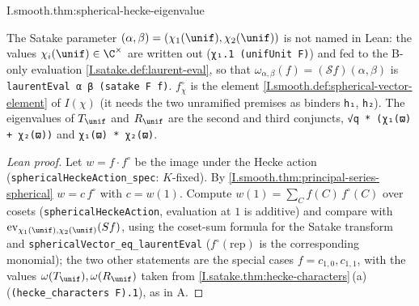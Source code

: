 \begin{tfformal}{I.smooth.thm:spherical-hecke-eigenvalue}
\begin{tffidelity}
The Satake parameter $(\alpha,\beta)=(\chi_1(\unif),\chi_2(\unif))$ is not named in Lean: the values $\chi_i(\unif)\in\C^\times$ are written out (\texttt{χ₁.1 (unifUnit F)}) and fed to the B-only evaluation \cref{I.satake.def:laurent-eval}, so that $\omega_{\alpha,\beta}(f)=(\mathcal Sf)(\alpha,\beta)$ is \texttt{laurentEval α β (satake F f)}. $f^\circ_\chi$ is the element \cref{I.smooth.def:spherical-vector-element} of $I(\chi)$ (it needs the two unramified premises as binders \texttt{h₁}, \texttt{h₂}). The eigenvalues of $T_\unif$ and $R_\unif$ are the second and third conjuncts, \texttt{√q * (χ₁(ϖ) + χ₂(ϖ))} and \texttt{χ₁(ϖ) * χ₂(ϖ)}.
\end{tffidelity}
\end{tfformal}
\begin{proof}[Lean proof]
Let $w=f\cdot f^\circ$ be the image under the Hecke action (\texttt{sphericalHeckeAction\_spec}: $K$-fixed). By \cref{I.smooth.thm:principal-series-spherical} $w=c\,f^\circ$ with $c=w(1)$. Compute $w(1)=\sum_C f(C)\,f^\circ(C)$ over cosets (\texttt{sphericalHeckeAction}, evaluation at $1$ is additive) and compare with $\mathrm{ev}_{\chi_1(\unif),\chi_2(\unif)}(S f)$, using the coset-sum formula for the Satake transform and \texttt{sphericalVector\_eq\_laurentEval} ($f^\circ(\mathrm{rep})$ is the corresponding monomial); the two other statements are the special cases $f=c_{1,0},c_{1,1}$, with the values $\omega(T_\unif),\omega(R_\unif)$ taken from \cref{I.satake.thm:hecke-characters}\,(a) (\texttt{(hecke\_characters F).1}), as in A.
\end{proof}

